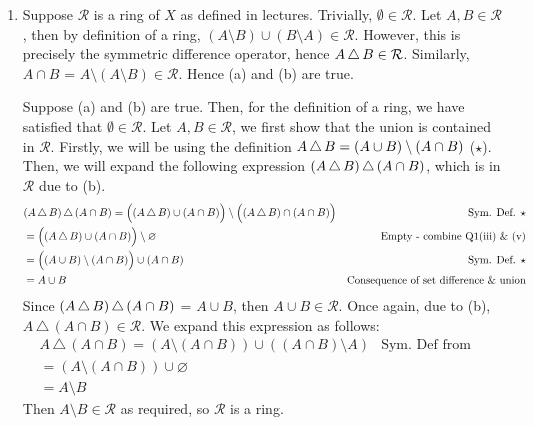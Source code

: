 \documentclass{article}
\begin{document}
\begin{flushleft}
\begin{enumerate}[label=(\roman*)]
    
    \item Suppose $\mathcal{R}$ is a ring of $X$ as defined in lectures. Trivially, $\emptyset \in \mathcal{R}$. Let $A, B \in \mathcal{R}$, then by definition of a ring, $(A \setminus B) \cup (B \setminus A) \in \mathcal{R}$. However, this is precisely the symmetric difference operator, hence $A \, \triangle \, B \in \mathcal{R}$. Similarly, $A \cap B$ = $A \setminus (A \setminus B) \in \mathcal{R}$. Hence (a) and (b) are true. \newline 

    Suppose (a) and (b) are true. Then, for the definition of a ring, we have satisfied that $\emptyset \in \mathcal{R}$. Let $A, B \in \mathcal{R}$, we first show that the union is contained in $\mathcal{R}$. Firstly, we will be using the definition $A \, \triangle \, B = (A \cup B) \setminus (A \cap B)$ ($\star$). Then, we will expand the following expression $(A \, \triangle \, B) \, \triangle \, (A \cap B)$, which is in $\mathcal{R}$ due to (b).
    \begin{align*}
        & (A \, \triangle \, B) \, \triangle \, (A \cap B) = \Big((A \, \triangle \, B) \cup (A \cap B)\Big) \setminus \Big((A \, \triangle \, B) \cap (A \cap B)\Big) & \text{Sym. Def. $\star$} \\
        & = \Big((A \, \triangle \, B) \cup (A \cap B)\Big) \setminus \varnothing & \text{Empty - combine Q1(iii) \& (v)} \\ 
        & = \Big((A \cup B) \setminus (A \cap B)\Big) \cup (A \cap B)& \text{Sym. Def. $\star$} \\
        & = A \cup B & \text{Consequence of set difference \& union} 
    \end{align*}
    Since $(A \, \triangle \, B) \, \triangle \, (A \cap B)$ = $A \cup B$, then $A \cup B \in \mathcal{R}$.
    Once again, due to (b), $A \, \triangle \, (A \cap B) \in \mathcal{R}$. We expand this expression as follows: 
    \begin{align*}
        & A \, \triangle \, (A \cap B) = (A \setminus (A \cap B)) \cup ((A \cap B) \setminus A) & \text{Sym. Def from Lecture} \\ 
        & = (A \setminus (A \cap B)) \cup \varnothing & \\ 
        & = A \setminus B &
    \end{align*}
    Then $A \setminus B \in \mathcal{R}$ as required, so $\mathcal{R}$ is a ring.
    

\end{enumerate}
\end{flushleft}
\end{document}
